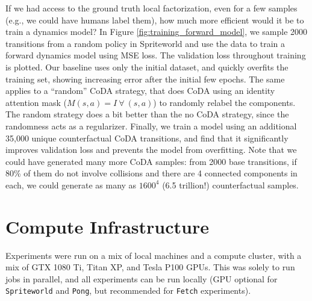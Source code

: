 \documentclass[coda.tex]{subfiles}
\begin{document}
If we had access to the ground truth local factorization, even for a few samples (e.g., we could have humans label them), how much more efficient would it be to train a dynamics model? In Figure \ref{fig:training_forward_model}, we sample 2000 transitions from a random policy in Spriteworld and use the data to train a forward dynamics model using MSE loss. The validation loss throughout training is plotted. Our baseline uses only the initial dataset, and quickly overfits the training set, showing increasing error after the initial few epochs. The same applies to a ``random'' CoDA strategy, that does CoDA using an identity attention mask ($M(s, a) = I \ \forall \ (s, a)$) to randomly relabel the components. The random strategy does a bit better than the no CoDA strategy, since the randomness acts as a regularizer. Finally, we train a model using an additional 35,000 unique counterfactual CoDA transitions, and find that it significantly improves validation loss and prevents the model from overfitting. Note that we could have generated many more CoDA samples: from 2000 base transitions, if 80\% of them do not involve collisions and there are 4 connected components in each, we could generate as many as $1600^4$ (6.5 trillion!) counterfactual samples.  

\section{Compute Infrastructure}

Experiments were run on a mix of local machines and a compute cluster, with a mix of GTX 1080 Ti, Titan XP, and Tesla P100 GPUs. This was solely to run jobs in parallel, and all experiments can be run locally (GPU optional for \texttt{Spriteworld} and \texttt{Pong}, but recommended for \texttt{Fetch} experiments).
\end{document}
